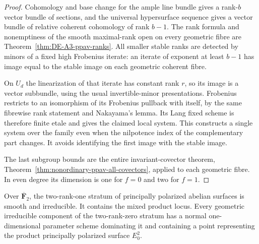 \begin{proof}
Cohomology and base change for the ample line bundle gives
a rank-$b$ vector bundle of sections, and the universal
hypersurface sequence gives a vector bundle of relative
coherent cohomology of rank $b-1$. The rank formula and
nonemptiness of the smooth maximal-rank open on every
geometric fibre are Theorem~\ref{thm:DE-A3-ppav-ranks}.
All smaller stable ranks are detected by minors of a fixed
high Frobenius iterate: an iterate of exponent at least
$b-1$ has image equal to the stable image on each geometric
coherent fibre.

On $U_d$ the linearization of that iterate has constant rank
$r$, so its image is a vector subbundle, using the usual
invertible-minor presentations. Frobenius restricts to an
isomorphism of its Frobenius pullback with itself, by the
same fibrewise rank statement and Nakayama's lemma. Its
Lang fixed scheme is therefore finite etale and gives the
claimed local system. This constructs a single system over
the family even when the nilpotence index of the complementary
part changes. It avoids identifying the first image with
the stable image.

The last subgroup bounds are the entire invariant-covector
theorem, Theorem~\ref{thm:nonordinary-ppav-all-covectors},
applied to each geometric fibre. In even degree its
dimension is one for $f=0$ and two for $f=1$.
\end{proof}

\begin{lemma}
\label{lem:ppav-nonordinary-strata-candidate}
Over $\overline{\mathbf F}_2$, the two-rank-one stratum of
principally polarized abelian surfaces is smooth and
irreducible. It contains the mixed product locus.
Every geometric irreducible component of the two-rank-zero
stratum has a normal one-dimensional parameter scheme
dominating it and containing a point representing the
product principally polarized surface $E_0^2$.
\end{lemma}

